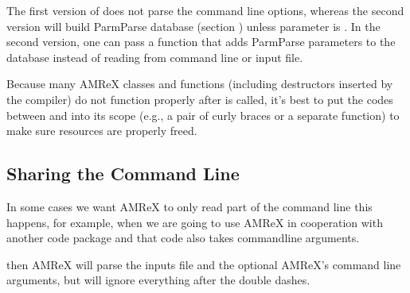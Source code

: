 \documentclass[letterpaper,10pt,english]{sphinxmanual}
\begin{document}
\sphinxAtStartPar
The first version of  does not parse the command line
options, whereas the second version will build ParmParse database
(section {\hyperref[\detokenize{Basics:sec-basics-parmparse}]{}}) unless 
parameter is .  In the second version, one can pass a
function that adds ParmParse parameters to the database instead of
reading from command line or input file.

\sphinxAtStartPar
Because many AMReX classes and functions (including destructors
inserted by the compiler) do not function properly after
 is called, it’s best to put the codes between
 and  into its scope
(e.g., a pair of curly braces or a separate function) to make sure
resources are properly freed.


\subsection{Sharing the Command Line}
\label{\detokenize{Basics:sharing-the-command-line}}
\sphinxAtStartPar
In some cases we want AMReX to only read part of the command line \textendash{} this happens, for example, when we
are going to use AMReX in cooperation with another code package and that code also takes command\sphinxhyphen{}line
arguments.

\begin{sphinxVerbatim}[commandchars=\\\{\}]
\end{sphinxVerbatim}

\sphinxAtStartPar
then AMReX will parse the inputs file and the optional AMReX’s command
line arguments, but will ignore everything after the double dashes.
\end{document}
